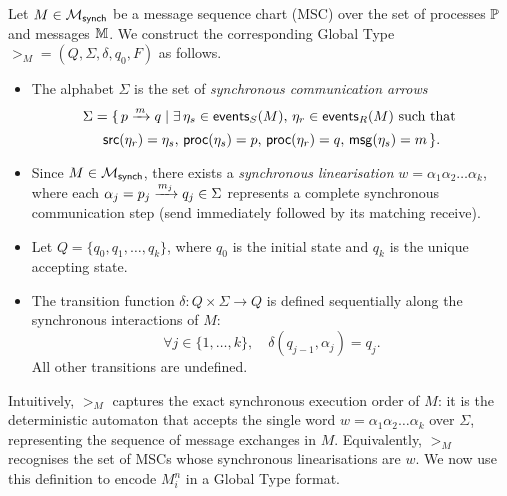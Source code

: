 \begin{definition}[$\gt_M$]\label{def:gm}
Let $M \in \mscsetofmodel{\synchmodel}$ be a message sequence chart (MSC)  
over the set of processes $\Procs$ and messages $\Messages$.  
We construct the corresponding Global Type $\gt_M = (Q, \Sigma, \delta, q_0, F)$  
as follows.

\begin{itemize}

    \item
    The alphabet $\Sigma$ is the set of \emph{synchronous communication arrows}  
    \[
        \Sigma = \{\, \marrow{p}{q}{m} \mid 
        \exists \, \event_s \in \sendeventsof{M}, \, 
        \event_r \in \receiveeventsof{M} \text{ such that }
	\]
    \[
        \source(\event_r) = \event_s, \, 
        \processof{\event_s}=p, \, \processof{\event_r}=q, \, 
        \messageof{\event_s}=m \,\}.
    \]

    \item
    Since $M \in \mscsetofmodel{\synchmodel}$, there exists a  
    \emph{synchronous linearisation}  
    $w = \alpha_1 \alpha_2 \ldots \alpha_k$,  
    where each $\alpha_j = \marrow{p_j}{q_j}{m_j} \in \Sigma$  
    represents a complete synchronous communication step (send immediately  
    followed by its matching receive).

    \item
    Let $Q = \{ q_0, q_1, \ldots, q_k \}$,  
    where $q_0$ is the initial state and $q_k$ is the unique accepting state.

    \item
    The transition function $\delta : Q \times \Sigma \to Q$  
    is defined sequentially along the synchronous interactions of $M$:  
    \[
        \forall j \in \{1, \ldots, k\}, \quad  
        \delta(q_{j-1}, \alpha_j) = q_j.
    \]
    All other transitions are undefined.

\end{itemize}

\end{definition}

Intuitively, $\gt_M$ captures the exact synchronous execution order of $M$:  
it is the deterministic automaton that accepts the single word  
$w = \alpha_1 \alpha_2 \ldots \alpha_k$ over $\Sigma$,  
representing the sequence of message exchanges in $M$.  
Equivalently, $\gt_M$ recognises the set of MSCs whose synchronous  
linearisations are $w$.
We now use this definition to encode $M_i^n$ in a Global Type format.


